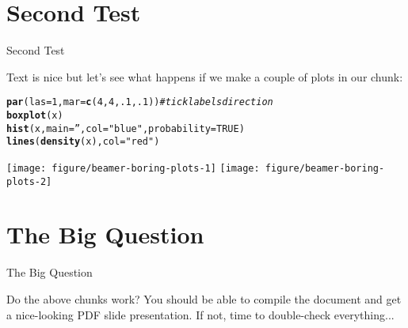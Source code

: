 \documentclass[10pt]{beamer}\usepackage[]{graphicx}\usepackage[]{color}
\makeatletter
\newcommand{\hlnum}[1]{\textcolor[rgb]{0.686,0.059,0.569}{#1}}%
\newcommand{\hlstr}[1]{\textcolor[rgb]{0.192,0.494,0.8}{#1}}%
\newcommand{\hlcom}[1]{\textcolor[rgb]{0.678,0.584,0.686}{\textit{#1}}}%
\newcommand{\hlstd}[1]{\textcolor[rgb]{0.345,0.345,0.345}{#1}}%
\newcommand{\hlkwc}[1]{\textcolor[rgb]{0.333,0.667,0.333}{#1}}%
\newcommand{\hlkwd}[1]{\textcolor[rgb]{0.737,0.353,0.396}{\textbf{#1}}}%
\newenvironment{kframe}{%
 \def\at@end@of@kframe{}%
 \ifinner\ifhmode%
  \def\at@end@of@kframe{\end{minipage}}%
  \begin{minipage}{\columnwidth}%
 \fi\fi%
 \def\FrameCommand##1{\hskip\@totalleftmargin \hskip-\fboxsep
 \colorbox{shadecolor}{##1}\hskip-\fboxsep
     \hskip-\linewidth \hskip-\@totalleftmargin \hskip\columnwidth}%
 \MakeFramed {\advance\hsize-\width
   \@totalleftmargin\z@ \linewidth\hsize
   \@setminipage}}%
 {\par\unskip\endMakeFramed%
 \at@end@of@kframe}
\newenvironment{knitrout}{}{} %
\makeatother
\begin{document}
\section{Second Test}
\begin{frame}[fragile]{Second Test}

Text is nice but let's see what happens if we make a couple of plots
in our chunk:

\begin{knitrout}\footnotesize
{}\color{fgcolor}\begin{kframe}
\begin{alltt}
\hlkwd{par}\hlstd{(}\hlkwc{las}\hlstd{=}\hlnum{1}\hlstd{,}\hlkwc{mar}\hlstd{=}\hlkwd{c}\hlstd{(}\hlnum{4}\hlstd{,}\hlnum{4}\hlstd{,}\hlnum{.1}\hlstd{,}\hlnum{.1}\hlstd{))}  \hlcom{# tick labels direction}
\hlkwd{boxplot}\hlstd{(x)}
\hlkwd{hist}\hlstd{(x,}\hlkwc{main}\hlstd{=}\hlstr{''}\hlstd{,}\hlkwc{col}\hlstd{=}\hlstr{"blue"}\hlstd{,}\hlkwc{probability}\hlstd{=}\hlnum{TRUE}\hlstd{)}
\hlkwd{lines}\hlstd{(}\hlkwd{density}\hlstd{(x),}\hlkwc{col}\hlstd{=}\hlstr{"red"}\hlstd{)}
\end{alltt}
\end{kframe}

{\centering \texttt{[image: figure/beamer-boring-plots-1]} 
\texttt{[image: figure/beamer-boring-plots-2]} 

}



\end{knitrout}
\end{frame}

\section{The Big Question}
\begin{frame}{The Big Question}

Do the above chunks work? You should be able to compile the 
document and get a nice-looking PDF slide presentation. If not, time
to double-check everything...
\end{frame}
\end{document}
